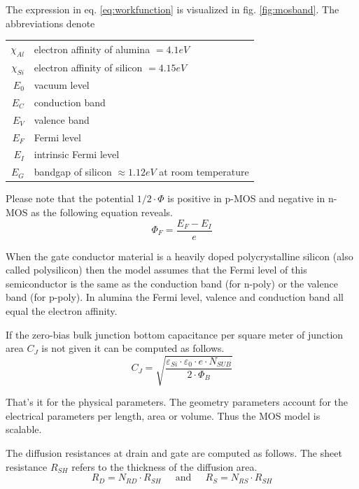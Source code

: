 \documentclass[10pt]{report}
\begin{document}
The expression in eq. \eqref{eq:workfunction} is visualized in
fig. \ref{fig:mosband}.  The abbreviations denote

\addvspace{12pt}

\begin{tabular}{rl}
$\chi_{Al}$ & electron affinity of alumina $= 4.1eV$\\
$\chi_{Si}$ & electron affinity of silicon $= 4.15eV$\\
$E_0$ & vacuum level\\
$E_C$ & conduction band\\
$E_V$ & valence band\\
$E_F$ & Fermi level\\
$E_I$ & intrinsic Fermi level\\
$E_G$ & bandgap of silicon $\approx 1.12eV$ at room temperature\\
\end{tabular}

\addvspace{12pt}

Please note that the potential $1/2\cdot \Phi$ is positive in p-MOS
and negative in n-MOS as the following equation reveals.
\begin{equation}
\Phi_F = \dfrac{E_F - E_I}{e}
\end{equation}

When the gate conductor material is a heavily doped polycrystalline
silicon (also called polysilicon) then the model assumes that the
Fermi level of this semiconductor is the same as the conduction band
(for n-poly) or the valence band (for p-poly).  In alumina the Fermi
level, valence and conduction band all equal the electron affinity.

\addvspace{12pt}

If the zero-bias bulk junction bottom capacitance per square meter of
junction area $C_J$ is not given it can be computed as follows.
\begin{equation}
C_J = \sqrt{\dfrac{\varepsilon_{Si}\cdot \varepsilon_{0}\cdot e\cdot N_{SUB}}{2\cdot \Phi_B}}
\end{equation}

That's it for the physical parameters.  The geometry parameters
account for the electrical parameters per length, area or volume.
Thus the MOS model is scalable.

\addvspace{12pt}

The diffusion resistances at drain and gate are computed as follows.
The sheet resistance $R_{SH}$ refers to the thickness of the diffusion
area.
\begin{equation}
R_D = N_{RD}\cdot R_{SH}
\;\;\;\; \textrm{ and } \;\;\;\;
R_S = N_{RS}\cdot R_{SH}
\end{equation}
\end{document}
